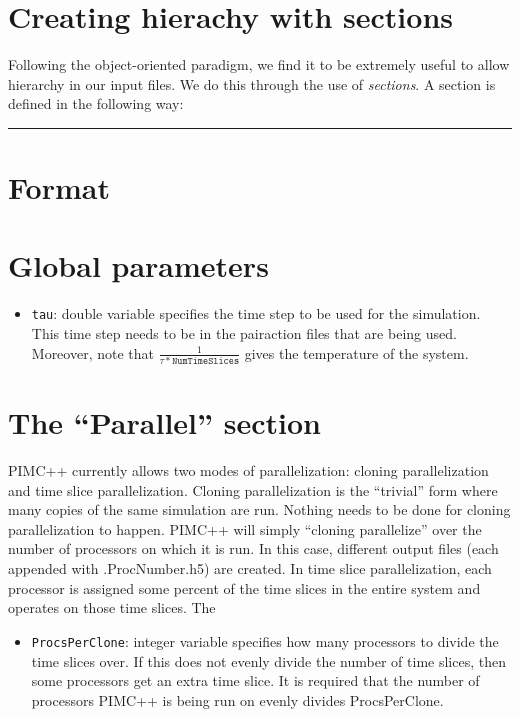 \documentclass{book}
\begin{document}
\section{Creating hierachy with sections}
Following the object-oriented paradigm, we find it to be extremely
useful to allow hierarchy in our input files.  We do this through the
use of {\em sections}.  A section is defined in the following way:\\
\rule{0.6cm}{0cm}

\section{Format}
\section{Global parameters}
\begin{itemize}
\item \texttt{tau}: double variable specifies the time step to be used
  for the simulation.  This time step needs to be in the pairaction
  files that are being used. Moreover, note that
  $\frac{1}{\tau*\texttt{NumTimeSlices}}$ gives the temperature of the
  system.
\end{itemize}
\section{The ``Parallel'' section}
PIMC++ currently allows two modes of parallelization: cloning
parallelization and time slice parallelization.  Cloning
parallelization is the ``trivial'' form where  many copies of the same
simulation are run.  Nothing needs to be done for cloning
parallelization to happen.  PIMC++ will simply ``cloning parallelize''
over the number of processors on which it is run.  In this case,
different output files (each 
appended with .ProcNumber.h5) are created.  In time slice
parallelization, each processor is assigned some percent of the time
slices in the entire system and operates on those time slices.  The \\
\begin{itemize}
\item \texttt{ProcsPerClone}: integer variable specifies how many
  processors to divide the time slices over. If this does not evenly
  divide the number of time slices, then some processors get an extra
  time slice.  It is required that the number of processors PIMC++ is
  being run on evenly divides ProcsPerClone.  
\end{itemize}
\end{document}
